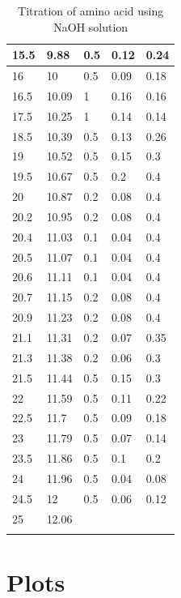 \documentclass[11pt, a4paper, abstract=true]{scrartcl}
\begin{document}
{\begin{longtable}{|l|l|l|l|l|}
    15.5  & 9.88  & 0.5  & 0.12 & 0.24 \\ \hline
    16    & 10    & 0.5  & 0.09 & 0.18 \\ \hline
    16.5  & 10.09 & 1    & 0.16 & 0.16 \\ \hline
    17.5  & 10.25 & 1    & 0.14 & 0.14 \\ \hline
    18.5  & 10.39 & 0.5  & 0.13 & 0.26 \\ \hline
    19    & 10.52 & 0.5  & 0.15 & 0.3  \\ \hline
    19.5  & 10.67 & 0.5  & 0.2  & 0.4  \\ \hline
    20    & 10.87 & 0.2  & 0.08 & 0.4  \\ \hline
    20.2  & 10.95 & 0.2  & 0.08 & 0.4  \\ \hline
    20.4  & 11.03 & 0.1  & 0.04 & 0.4  \\ \hline
    20.5  & 11.07 & 0.1  & 0.04 & 0.4  \\ \hline
    20.6  & 11.11 & 0.1  & 0.04 & 0.4  \\ \hline
    20.7  & 11.15 & 0.2  & 0.08 & 0.4  \\ \hline
    20.9  & 11.23 & 0.2  & 0.08 & 0.4  \\ \hline
    21.1  & 11.31 & 0.2  & 0.07 & 0.35 \\ \hline
    21.3  & 11.38 & 0.2  & 0.06 & 0.3  \\ \hline
    21.5  & 11.44 & 0.5  & 0.15 & 0.3  \\ \hline
    22    & 11.59 & 0.5  & 0.11 & 0.22 \\ \hline
    22.5  & 11.7  & 0.5  & 0.09 & 0.18 \\ \hline
    23    & 11.79 & 0.5  & 0.07 & 0.14 \\ \hline
    23.5  & 11.86 & 0.5  & 0.1  & 0.2  \\ \hline
    24    & 11.96 & 0.5  & 0.04 & 0.08 \\ \hline
    24.5  & 12    & 0.5  & 0.06 & 0.12 \\ \hline
    25    & 12.06 &      &      &      \\ \hline
    \caption{Titration of amino acid using NaOH solution}
    \end{longtable}
}

\section{Plots}
\end{document}
